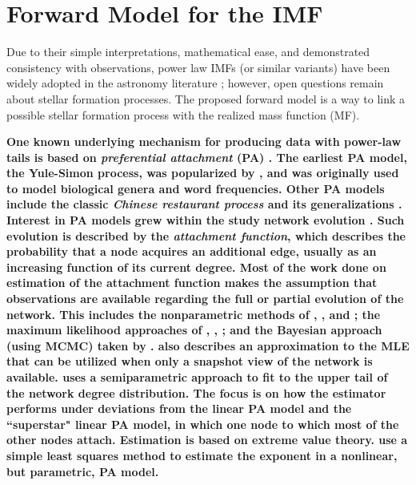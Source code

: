 \documentclass[ejs]{imsart}
\numberwithin{equation}{section}
\theoremstyle{plain}
\newcommand{\new}[1]{{\bf #1}}
\begin{document}


\section{Forward Model for the IMF}
\label{PAmodelSection}
Due to their simple interpretations, mathematical ease, and demonstrated consistency with observations, power law IMFs (or similar variants) have been widely adopted in the astronomy literature \citep{kroupa2012}; however, open questions remain about stellar formation processes.  The proposed forward model is a way to link a possible stellar formation process with the realized mass function (MF).  

\new{
One known underlying mechanism for producing data with power-law tails is based on {\em preferential attachment} (PA) \citep{Mitzenmacher2004}.  
The earliest PA model, the Yule-Simon process, was popularized by \cite{simon55}, and was originally used to model biological genera and word frequencies. Other PA models include the classic {\it Chinese restaurant process}
and its generalizations \citep{Bloem2017}.
Interest in PA models grew within the study network evolution
\citep{BarabasiAlbert1999}.
Such evolution is described by the {\it attachment function}, which
describes the probability that a node acquires an additional edge,
usually as an increasing function of its current degree.
Most of the work done on estimation of the attachment function
makes the assumption that observations are available regarding
the full or partial evolution of the network.
This includes the nonparametric methods of 
\cite{Jeong2003}, \cite{Newman2001}, and \cite{Pham2015};
the maximum likelihood approaches of 
\cite{Gomez2011}, \cite{Wan2017a}, \cite{Onodera2014}; and
the Bayesian approach (using MCMC) taken by \cite{Sheridan2012}.
\cite{Wan2017a} also describes 
an approximation to the MLE that can be utilized when only a snapshot view of
the network is available.
\cite{Wan2017b} uses a semiparametric approach to fit to the upper tail of the
network degree distribution. The focus is on how the estimator performs
under deviations from the linear PA model and the ``superstar" linear PA
model, in which one node to which most of the other nodes attach. Estimation 
is based on extreme value theory.
\cite{Kunegis2013} use a simple least squares method to estimate the exponent
in a nonlinear, but parametric, PA model.}
\end{document}
